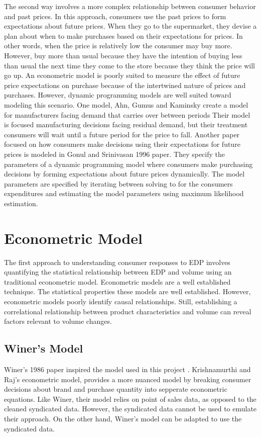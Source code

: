\documentclass{article}
\begin{document}
The second way involves a more complex relationship between consumer behavior and past prices. In this approach, consumers use the past prices to form expectations about future prices. When they go to the supermarket, they devise a plan about when to make purchases based on their expectations for prices. In other words, when the price is relatively low the consumer may buy more. However, buy more than usual because they have the intention of buying less than usual the next time they come to the store because they think the price will go up. An econometric model is poorly suited to measure the effect of future price expectations on purchase because of the intertwined nature of prices and purchases. However, dynamic programming models are well suited toward modeling this scenario.  One model, Ahn, Gumus and Kaminsky create a model for manufacturers facing demand that carries over between periods \cite{ahn} Their model is focused manufacturing decisions facing residual demand, but their treatment consumers will wait until a future period for the price to fall. Another paper focused on how consumers make decisions using their expectations for future prices is modeled in Gonul and Srinivasan 1996 paper\cite{gonul}. They specify the parameters of a dynamic programming model where consumers make purchasing decisions by forming expectations about future prices dynamically. The model parameters are specified by iterating between solving to for the consumers expenditures and estimating the model parameters using maximum likelihood estimation.

\section{Econometric Model}

The first approach to understanding consumer responses to EDP involves quantifying the statistical relationship between EDP and volume using an traditional econometric model.  Econometric models are a well established technique. The statistical properties these models are well established. However, econometric models poorly identify causal relationships. Still, establishing a correlational relationship between product characteristics and volume can reveal factors relevant to volume changes.

\subsection{Winer's Model}

Winer's 1986 paper inspired the model used in this project \cite{winer}. Krishnamurthi and Raj's econometric model, provides a more nuanced model by breaking consumer decisions about brand and purchase quantity into sepperate econometric equations. Like Winer, their model relies on point of sales data, as opposed to the cleaned syndicated data. However, the syndicated data cannot be used to emulate their approach. On the other hand, Winer's model can be adapted to use the syndicated data.
\end{document}
